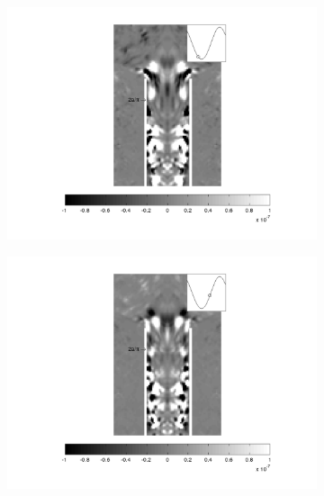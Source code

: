 \begin{landscape}
\begin{figure}[ht!]
\begin{subfigure}{0.55 \textwidth}
  \caption[]{}
  \label{fig:max_01_2}
\end{subfigure}
\begin{subfigure}{0.55 \textwidth}
  \includegraphics[width=1.\linewidth]{figuras/max_ka_01_3.png}
  \caption[]{}
  \label{fig:max_01_3}
\end{subfigure}
\par\medskip
\begin{subfigure}{0.55 \textwidth}
  \includegraphics[width=1.\linewidth]{figuras/max_ka_01_4.png}
  \caption[]{}
  \label{fig:max_01_4}
\end{subfigure}
\begin{subfigure}{0.55 \textwidth}

\end{subfigure}
\end{figure}
\end{landscape}
